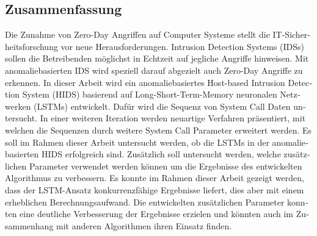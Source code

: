 \begin{otherlanguage}{ngerman}
\chapter*{Zusammenfassung}
Die Zunahme von Zero-Day Angriffen auf Computer Systeme stellt die IT-Sicherheitsforschung vor neue Herausforderungen.
Intrusion Detection Systems (IDSs) sollen die Betreibenden möglichst in Echtzeit auf jegliche Angriffe hinweisen.
Mit anomaliebasierten IDS wird speziell darauf abgezielt auch Zero-Day Angriffe zu erkennen.
In dieser Arbeit wird ein anomaliebasiertes Host-based Intrusion Detection System (HIDS) basierend auf Long-Short-Term-Memory neuronalen Netzwerken (LSTMs) entwickelt.
Dafür wird die Sequenz von System Call Daten untersucht.
In einer weiteren Iteration werden neuartige Verfahren präsentiert, mit welchen die Sequenzen durch weitere System Call Parameter erweitert werden.
Es soll im Rahmen dieser Arbeit untersucht werden, ob die LSTMs in der anomaliebasierten HIDS erfolgreich sind.
Zusätzlich soll untersucht werden, welche zusätzlichen Parameter verwendet werden können um die Ergebnisse des entwickelten Algorithmus zu verbessern.
Es konnte im Rahmen dieser Arbeit gezeigt werden, dass der LSTM-Ansatz konkurrenzfähige Ergebnisse liefert, dies aber mit einem erheblichen Berechnungsaufwand.
Die entwickelten zusätzlichen Parameter konnten eine deutliche Verbesserung der Ergebnisse erzielen und könnten auch im Zusammenhang mit anderen Algorithmen ihren Einsatz finden.
\end{otherlanguage}

\endgroup

\vfill
